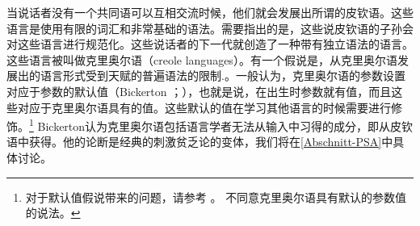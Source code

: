 当说话者没有一个共同语可以互相交流时候，他们就会发展出所谓的皮钦语。这些语言是使用有限的词汇和非常基础的语法。需要指出的是，这些说皮钦语的子孙会对这些语言进行规范化。这些说话者的下一代就创造了一种带有独立语法的语言。这些语言被叫做克里奥尔语（creole languages）。有一个假说是，从克里奥尔语发展出的语言形式受到天赋的普遍语法的限制\citep{Bickerton84a}.。一般认为，克里奥尔语的参数设置对应于参数的默认值（Bickerton \citeyear[]{Bickerton84b}；\citeyear[]{Bickerton84a}），也就是说，在出生时参数就有值，而且这些对应于克里奥尔语具有的值。这些默认的值在学习其他语言的时候需要进行修饰。\footnote{%
对于默认值假说带来的问题，请参考 。 \citet[, fn.\,13]{Bickerton97a}不同意克里奥尔语具有默认的参数值的说法。
} 
Bickerton认为克里奥尔语包括语言学者无法从输入中习得的成分，即从皮钦语中获得。他的论断是经典的刺激贫乏论的变体，我们将在\ref{Abschnitt-PSA}中具体讨论。

